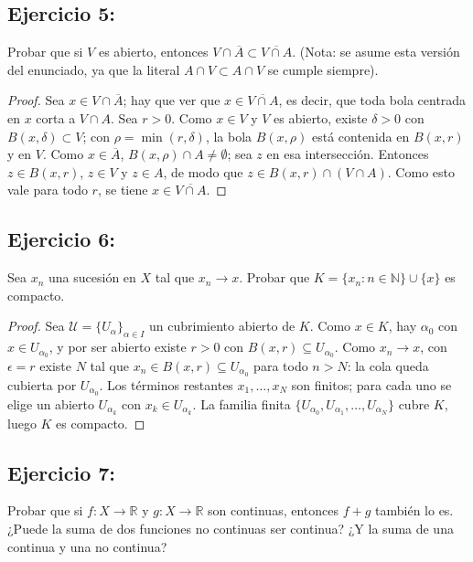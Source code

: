 \documentclass[11pt, a4paper]{article}
\begin{document}
\subsection*{Ejercicio 5:}

Probar que si $V$ es abierto, entonces $V \cap \overline{A} \subset \overline{V \cap A}$.
(Nota: se asume esta versión del enunciado, ya que la literal $A \cap V \subset A \cap V$ se cumple
siempre).

\begin{proof}
Sea $x \in V \cap \overline{A}$; hay que ver que $x \in \overline{V \cap A}$, es decir, que toda
bola centrada en $x$ corta a $V \cap A$. Sea $r > 0$. Como $x \in V$ y $V$ es abierto, existe
$\delta > 0$ con $B(x, \delta) \subset V$; con $\rho = \min(r, \delta)$, la bola $B(x, \rho)$ está
contenida en $B(x, r)$ y en $V$. Como $x \in \overline{A}$, $B(x, \rho) \cap A \neq \emptyset$; sea
$z$ en esa intersección. Entonces $z \in B(x, r)$, $z \in V$ y $z \in A$, de modo que
$z \in B(x, r) \cap (V \cap A)$. Como esto vale para todo $r$, se tiene $x \in \overline{V \cap A}$.
\end{proof}

\subsection*{Ejercicio 6:}

Sea $x_n$ una sucesión en $X$ tal que $x_n \to x$. Probar que
$K = \{x_n : n \in \mathbb{N}\} \cup \{x\}$ es compacto.

\begin{proof}
Sea $\mathcal{U} = \{U_\alpha\}_{\alpha \in I}$ un cubrimiento abierto de $K$. Como $x \in K$, hay
$\alpha_0$ con $x \in U_{\alpha_0}$, y por ser abierto existe $r > 0$ con
$B(x, r) \subseteq U_{\alpha_0}$. Como $x_n \to x$, con $\epsilon = r$ existe $N$ tal que
$x_n \in B(x, r) \subseteq U_{\alpha_0}$ para todo $n > N$: la cola queda cubierta por
$U_{\alpha_0}$. Los términos restantes $x_1, \dots, x_N$ son finitos; para cada uno se elige un
abierto $U_{\alpha_k}$ con $x_k \in U_{\alpha_k}$. La familia finita
$\{U_{\alpha_0}, U_{\alpha_1}, \dots, U_{\alpha_N}\}$ cubre $K$, luego $K$ es compacto.
\end{proof}

\subsection*{Ejercicio 7:}

Probar que si $f: X \to \mathbb{R}$ y $g: X \to \mathbb{R}$ son continuas, entonces $f+g$ también lo
es.
¿Puede la suma de dos funciones no continuas ser continua?
¿Y la suma de una continua y una no continua?
\end{document}
